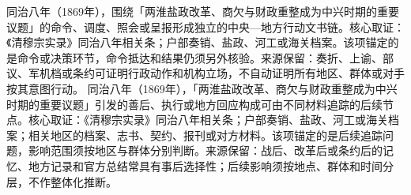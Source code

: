 同治八年（1869年），围绕「两淮盐政改革、商欠与财政重整成为中兴时期的重要议题」的命令、调度、照会或呈报形成独立的中央—地方行动文书链。核心取证：《清穆宗实录》同治八年相关条；户部奏销、盐政、河工或海关档案。该项锚定的是命令或决策环节，命令抵达和结果仍须另外核验。来源保留：奏折、上谕、部议、军机档或条约可证明行政动作和机构立场，不自动证明所有地区、群体或对手按其意图行动。
同治八年（1869年），「两淮盐政改革、商欠与财政重整成为中兴时期的重要议题」引发的善后、执行或地方回应构成可由不同材料追踪的后续节点。核心取证：《清穆宗实录》同治八年相关条；户部奏销、盐政、河工或海关档案；相关地区的档案、志书、契约、报刊或对方材料。该项锚定的是后续追踪问题，影响范围须按地区与群体分别判断。来源保留：战后、改革后或条约后的记忆、地方记录和官方总结常具有事后选择性；后续影响须按地点、群体和时间分层，不作整体化推断。
